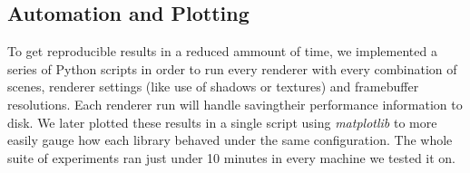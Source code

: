 \clearpage
\subsection{Automation and Plotting}
To get reproducible results in a reduced ammount of time, we implemented a series of Python scripts in order to run every renderer with every combination of scenes, renderer settings (like use of shadows or textures) and framebuffer resolutions. Each renderer run will handle savingtheir performance information to disk. We later plotted these results in a single script using \textit{matplotlib} to more easily gauge how each library behaved under the same configuration. The whole suite of experiments ran just under 10 minutes in every machine we tested it on.
